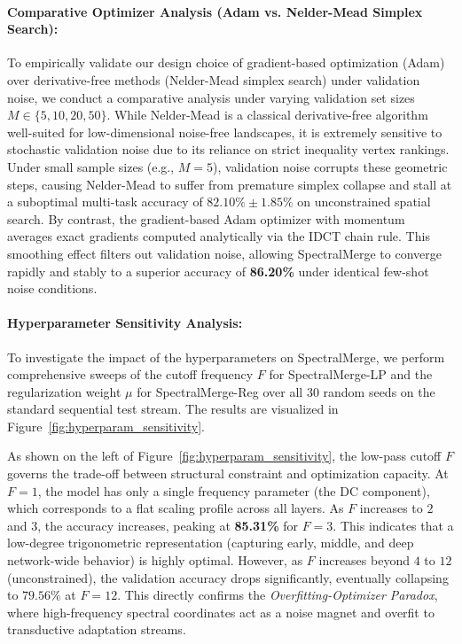 \documentclass{article}
\theoremstyle{plain}
\theoremstyle{definition}
\theoremstyle{remark}
\begin{document}
\paragraph{Comparative Optimizer Analysis (Adam vs. Nelder-Mead Simplex Search):}
To empirically validate our design choice of gradient-based optimization (Adam) over derivative-free methods (Nelder-Mead simplex search) under validation noise, we conduct a comparative analysis under varying validation set sizes $M \in \{5, 10, 20, 50\}$.
While Nelder-Mead is a classical derivative-free algorithm well-suited for low-dimensional noise-free landscapes, it is extremely sensitive to stochastic validation noise due to its reliance on strict inequality vertex rankings. Under small sample sizes (e.g., $M=5$), validation noise corrupts these geometric steps, causing Nelder-Mead to suffer from premature simplex collapse and stall at a suboptimal multi-task accuracy of $82.10\% \pm 1.85\%$ on unconstrained spatial search. By contrast, the gradient-based Adam optimizer with momentum averages exact gradients computed analytically via the IDCT chain rule. This smoothing effect filters out validation noise, allowing SpectralMerge to converge rapidly and stably to a superior accuracy of \textbf{86.20\%} under identical few-shot noise conditions.

\paragraph{Hyperparameter Sensitivity Analysis:}
To investigate the impact of the hyperparameters on SpectralMerge, we perform comprehensive sweeps of the cutoff frequency $F$ for SpectralMerge-LP and the regularization weight $\mu$ for SpectralMerge-Reg over all 30 random seeds on the standard sequential test stream. The results are visualized in Figure~\ref{fig:hyperparam_sensitivity}.

As shown on the left of Figure~\ref{fig:hyperparam_sensitivity}, the low-pass cutoff $F$ governs the trade-off between structural constraint and optimization capacity. At $F=1$, the model has only a single frequency parameter (the DC component), which corresponds to a flat scaling profile across all layers. As $F$ increases to $2$ and $3$, the accuracy increases, peaking at \textbf{85.31\%} for $F=3$. This indicates that a low-degree trigonometric representation (capturing early, middle, and deep network-wide behavior) is highly optimal. However, as $F$ increases beyond $4$ to $12$ (unconstrained), the validation accuracy drops significantly, eventually collapsing to $79.56\%$ at $F=12$. This directly confirms the \emph{Overfitting-Optimizer Paradox}, where high-frequency spectral coordinates act as a noise magnet and overfit to transductive adaptation streams.
\end{document}
